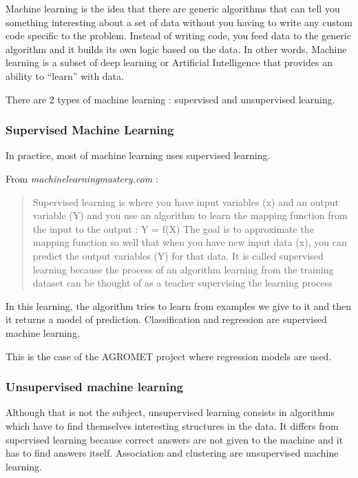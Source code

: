 \documentclass[12pt,twoside]{reedthesis}
\theoremstyle{definition}
\theoremstyle{definition}
\theoremstyle{definition}
\theoremstyle{remark}
\begin{document}
Machine learning is the idea that there are generic algorithms that can
tell you something interesting about a set of data without you having to
write any custom code specific to the problem. Instead of writing code,
you feed data to the generic algorithm and it builds its own logic based
on the data. In other words, Machine learning is a subset of deep
learning or Artificial Intelligence that provides an ability to
``learn'' with data.

There are 2 types of machine learning : supervised and unsupervised
learning.

\subsubsection{Supervised Machine
Learning}\label{supervised-machine-learning}

In practice, most of machine learning uses supervised learning.

From \emph{machinelearningmastery.com} :
\begin{quote}
Supervised learning is where you have input variables (x) and an output
variable (Y) and you use an algorithm to learn the mapping function from
the input to the output : Y = f(X) The goal is to approximate the
mapping function so well that when you have new input data (x), you can
predict the output variables (Y) for that data. It is called supervised
learning because the process of an algorithm learning from the training
dataset can be thought of as a teacher supervising the learning process
\end{quote}
In this learning, the algorithm tries to learn from examples we give to
it and then it returns a model of prediction. Classification and
regression are supervised machine learning.

This is the case of the AGROMET project where regression models are
used.

\subsubsection{Unsupervised machine
learning}\label{unsupervised-machine-learning}

Although that is not the subject, unsupervised learning consists in
algorithms which have to find themselves interesting structures in the
data. It differs from supervised learning because correct answers are
not given to the machine and it has to find answers itself. Association
and clustering are unsupervised machine learning.
\end{document}
